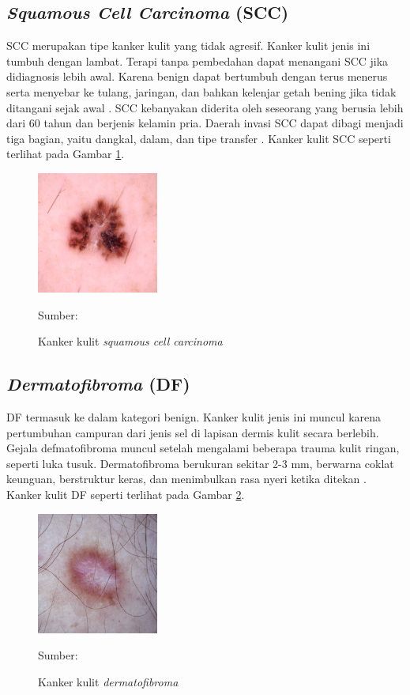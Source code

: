     \subsection{\textit{Squamous Cell Carcinoma} (SCC)}
    SCC merupakan tipe kanker kulit yang tidak agresif. Kanker kulit jenis ini tumbuh dengan lambat. Terapi tanpa pembedahan dapat menangani SCC jika didiagnosis lebih awal. Karena benign dapat bertumbuh dengan terus menerus serta menyebar ke tulang, jaringan, dan bahkan kelenjar getah bening jika tidak ditangani sejak awal \citep{Fuadah2020a}. SCC kebanyakan diderita oleh seseorang yang berusia lebih dari 60 tahun dan berjenis kelamin pria. Daerah invasi SCC dapat dibagi menjadi tiga bagian, yaitu dangkal, dalam, dan tipe transfer \citep{Sang2019}. Kanker kulit SCC seperti terlihat pada Gambar \ref{fig:scc}.
    \begin{figure}[H] 
        \begin{center} 
            \includegraphics[width=4cm]{../img/Skin Cancer SCC - Latex.jpg}
            \caption{Kanker kulit \textit{squamous cell carcinoma}} 
            \label{fig:scc}
            Sumber: \citep{Codella2018,Combalia2019,Tschandl2018}
        \end{center} 
    \end{figure}

    \subsection{\textit{Dermatofibroma} (DF)}
    DF termasuk ke dalam kategori benign. Kanker kulit jenis ini muncul karena pertumbuhan campuran dari jenis sel di lapisan dermis kulit secara berlebih. Gejala defmatofibroma muncul setelah mengalami beberapa trauma kulit ringan, seperti luka tusuk. Dermatofibroma berukuran sekitar 2-3 mm, berwarna coklat keunguan, berstruktur keras, dan menimbulkan rasa nyeri ketika ditekan \citep{Fuadah2020a}. Kanker kulit DF seperti terlihat pada Gambar \ref{fig:df}.
    \begin{figure}[H] 
        \begin{center} 
            \includegraphics[width=4cm]{../img/Skin Cancer DF - Latex.jpg}
            \caption{Kanker kulit \textit{dermatofibroma}} 
            \label{fig:df}
            Sumber: \citep{Codella2018,Combalia2019,Tschandl2018}
        \end{center} 
    \end{figure}

